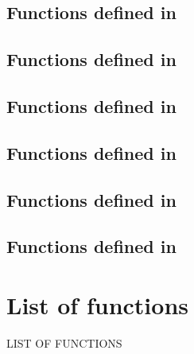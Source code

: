 \documentclass[english,a4paper,11pt,oldtoc,mctitle]{rapport3}
\begin{document}
\section{Functions defined in }
\label{sec:queryref}


\section{Functions defined in }
\label{sec:querylibref}


\section{Functions defined in }
\label{sec:menuref}


\section{Functions defined in }
\label{sec:menulibref}


\section{Functions defined in }
\label{sec:dockref}


\section{Functions defined in }
\label{sec:deref}



\appendix



\chapter*{List of functions}
%
         {\MakeUppercase{List of functions}}%

\makeatletter
\def\fnlisti#1{\@dottedtocline{1}{0em}{1.5em}{\lstinline!#1!}{\pageref{fn:#1}}}
{\parskip\z@}
\makeatother

\begin{htmlonly}
\newcommand{\fnlisti}[1]{\fnref{#1}\\}

\end{htmlonly}


\printindex
\end{document}
